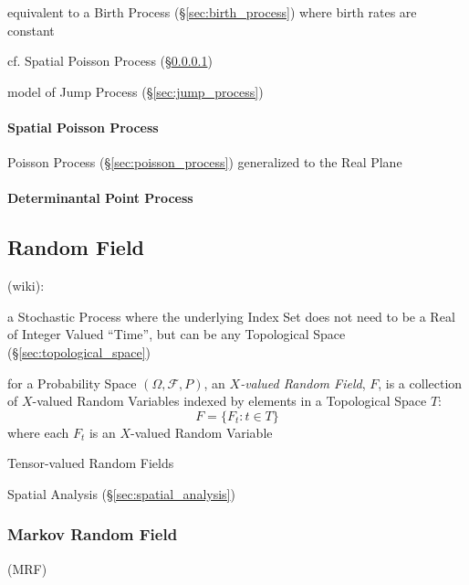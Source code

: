equivalent to a Birth Process (\S\ref{sec:birth_process}) where birth rates are
constant

cf. Spatial Poisson Process (\S\ref{sec:spatial_poisson})

model of Jump Process (\S\ref{sec:jump_process})



\paragraph{Spatial Poisson Process}\label{sec:spatial_poisson}\hfill

Poisson Process (\S\ref{sec:poisson_process}) generalized to the Real Plane



\paragraph{Determinantal Point Process}\label{sec:determinantal_process}\hfill



\subsection{Random Field}\label{sec:random_field}

(wiki):

a Stochastic Process where the underlying Index Set does not need to be a Real
of Integer Valued ``Time'', but can be any Topological Space
(\S\ref{sec:topological_space})

for a Probability Space $(\Omega, \mathcal{F}, P)$, an \emph{$X$-valued
  Random Field}, $F$, is a collection of $X$-valued Random Variables indexed by
elements in a Topological Space $T$:
\[
  F = \{ F_t : t \in T \}
\]
where each $F_t$ is an $X$-valued Random Variable

Tensor-valued Random Fields

\fist Spatial Analysis (\S\ref{sec:spatial_analysis})



\subsubsection{Markov Random Field}\label{sec:markov_random_field}

(MRF)

